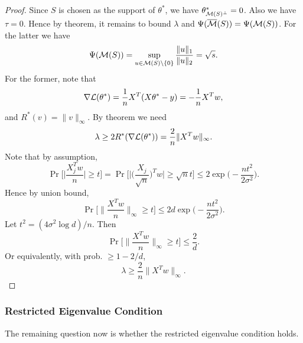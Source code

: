\begin{proof}
    Since $S$ is chosen as the support of $\theta^*$,
    we have $\theta^*_{\mathcal{M}(S)^\perp}=0$.
    Also we have $\tau=0$.
    Hence by theorem,
    it remains to bound $\lambda$ and $\Psi({\overline{\mathcal{M}}}(S))=\Psi(\mathcal{M}(S))$.
    For the latter we have
    \begin{equation}
        \Psi(\mathcal{M}(S)) = \sup_{u\in\mathcal{M}(S)\backslash\{0\}}\frac{\|u\|_1}{\|u\|_2}=\sqrt{s}.
    \end{equation}
    For the former, note that
    \begin{equation}
        \nabla\mathcal{L}(\theta^*) = \frac{1}{n}X^T(X\theta^*-y)=-\frac{1}{n}X^Tw,
    \end{equation}
    and $R^*(v)=\|v\|_\infty$.
    By theorem we need
    \begin{equation}
        \lambda\ge 2R^*(\nabla\mathcal{L}(\theta^*))=\frac{2}{n}\|X^Tw\|_\infty.
    \end{equation}
    Note that by assumption,
    \begin{equation}
        \Pr\bigg[\bigg|\frac{X_j^T w}{n}\bigg|\ge t\bigg]
            = \Pr\bigg[\bigg|\bigg(\frac{X_j}{\sqrt{n}}\bigg)^T w\bigg|\ge \sqrt{n}t\bigg]
            \le 2\exp\bigg(\!\!-\frac{nt^2}{2\sigma^2}\bigg).
    \end{equation}
    Hence by union bound,
    \begin{equation}
        \Pr\bigg[\bigg\|\frac{X^T w}{n}\bigg\|_\infty\ge t\bigg]
             \le 2d\exp\bigg(\!\!-\frac{nt^2}{2\sigma^2}\bigg).
    \end{equation}
    Let $t^2=(4\sigma^2\log d)/n$. Then
    \begin{equation}
        \Pr\bigg[\bigg\|\frac{X^T w}{n}\bigg\|_\infty\ge t\bigg] \le \frac{2}{d}.
    \end{equation}
    Or equivalently, with prob. $\ge 1-2/d$,
    \begin{equation}
        \lambda\ge \frac{2}{n}\|X^Tw\|_\infty.
    \end{equation}
\end{proof}

\subsubsection{Restricted Eigenvalue Condition}

The remaining question now is whether the restricted eigenvalue condition holds.
